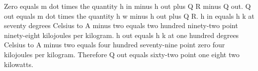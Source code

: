 Zero equals m dot times the quantity h in minus h out plus Q R minus Q out.  
Q out equals m dot times the quantity h w minus h out plus Q R.  
h in equals h k at seventy degrees Celsius to A minus two equals two hundred ninety-two point ninety-eight kilojoules per kilogram.  
h out equals h k at one hundred degrees Celsius to A minus two equals four hundred seventy-nine point zero four kilojoules per kilogram.  
Therefore Q out equals sixty-two point one eight two kilowatts.